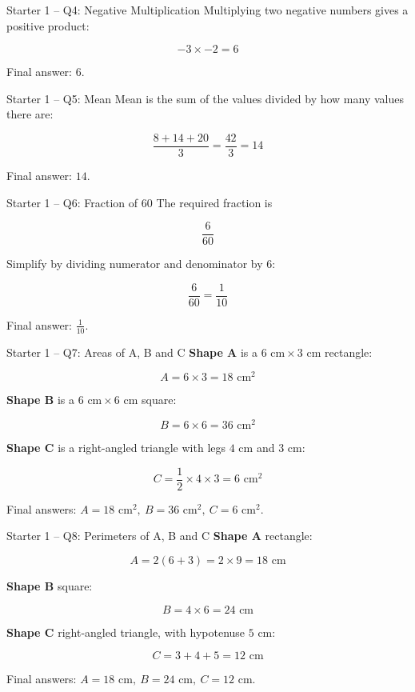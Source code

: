 \documentclass{beamer}
\begin{document}
\begin{frame}{Starter 1 -- Q4: Negative Multiplication}
\small
Multiplying two negative numbers gives a positive product:

\[
-3 \times -2 = 6
\]

Final answer: \(\boxed{6}\).
\end{frame}

\begin{frame}{Starter 1 -- Q5: Mean}
\small
Mean is the sum of the values divided by how many values there are:

\[
\frac{8+14+20}{3}=\frac{42}{3}=14
\]

Final answer: \(\boxed{14}\).
\end{frame}

\begin{frame}{Starter 1 -- Q6: Fraction of 60}
\small
The required fraction is

\[
\frac{6}{60}
\]

Simplify by dividing numerator and denominator by 6:

\[
\frac{6}{60}=\frac{1}{10}
\]

Final answer: \(\boxed{\frac{1}{10}}\).
\end{frame}

\begin{frame}{Starter 1 -- Q7: Areas of A, B and C}
\small
\textbf{Shape A} is a \(6\text{ cm}\times 3\text{ cm}\) rectangle:

\[
A=6\times 3=18\text{ cm}^2
\]

\textbf{Shape B} is a \(6\text{ cm}\times 6\text{ cm}\) square:

\[
B=6\times 6=36\text{ cm}^2
\]

\textbf{Shape C} is a right-angled triangle with legs \(4\text{ cm}\) and \(3\text{ cm}\):

\[
C=\frac12 \times 4 \times 3=6\text{ cm}^2
\]

Final answers: \(\boxed{A=18\text{ cm}^2,\ B=36\text{ cm}^2,\ C=6\text{ cm}^2}\).
\end{frame}

\begin{frame}{Starter 1 -- Q8: Perimeters of A, B and C}
\small
\textbf{Shape A} rectangle:

\[
A=2(6+3)=2\times 9=18\text{ cm}
\]

\textbf{Shape B} square:

\[
B=4\times 6=24\text{ cm}
\]

\textbf{Shape C} right-angled triangle, with hypotenuse \(5\text{ cm}\):

\[
C=3+4+5=12\text{ cm}
\]

Final answers: \(\boxed{A=18\text{ cm},\ B=24\text{ cm},\ C=12\text{ cm}}\).
\end{frame}
\end{document}
